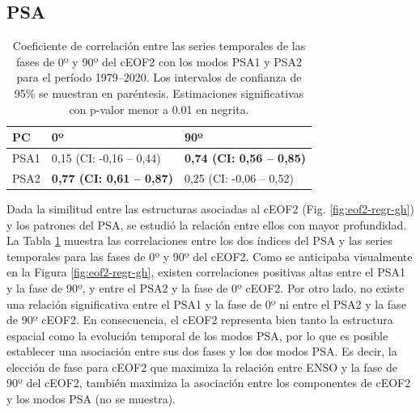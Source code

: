 \documentclass[12pt,oneside,a4paper]{reedthesis}
\begin{document}
\hypertarget{psa}{%
\subsection{PSA}\label{psa}}



\begin{table}

\caption{\label{tab:psa-eof2}Coeficiente de correlación entre las series temporales de las fases de 0º y 90º del cEOF2 con los modos PSA1 y PSA2 para el período 1979--2020. Los intervalos de confianza de 95\% se muestran en paréntesis. Estimaciones significativas con p-valor menor a 0.01 en negrita.}
\centering
\begin{tabular}[t]{l>{}l>{}l}
\toprule
PC & 0º & 90º\\
\midrule
PSA1 & 0,15 (CI: -0,16 -- 0,44) & \textbf{0,74 (CI: 0,56 -- 0,85)}\\
\cmidrule{1-3}
PSA2 & \textbf{0,77 (CI: 0,61 -- 0,87)} & 0,25 (CI: -0,06 -- 0,52)\\
\bottomrule
\end{tabular}
\end{table}

Dada la similitud entre las estructuras asociadas al cEOF2 (Fig. \ref{fig:eof2-regr-gh}) y los patrones del PSA, se estudió la relación entre ellos con mayor profundidad.
La Tabla \ref{tab:psa-eof2} muestra las correlaciones entre los dos índices del PSA y las series temporales para las fases de 0º y 90º del cEOF2.
Como se anticipaba visualmente en la Figura \ref{fig:eof2-regr-gh}, existen correlaciones positivas altas entre el PSA1 y la fase de 90º, y entre el PSA2 y la fase de 0º cEOF2.
Por otro lado, no existe una relación significativa entre el PSA1 y la fase de 0º ni entre el PSA2 y la fase de 90º cEOF2.
En consecuencia, el cEOF2 representa bien tanto la estructura espacial como la evolución temporal de los modos PSA, por lo que es posible establecer una asociación entre sus dos fases y los dos modos PSA.
Es decir, la elección de fase para cEOF2 que maximiza la relación entre ENSO y la fase de 90º del cEOF2, también maximiza la asociación entre los componentes de cEOF2 y los modos PSA (no se muestra).
\end{document}
